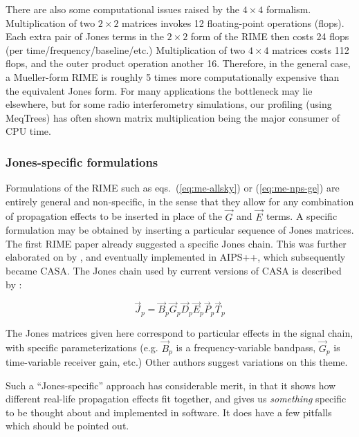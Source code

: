 \documentclass[]{aa}
\newcommand{\jones}[2]{\vec {#1}_{#2}}
\begin{document}
There are also some computational issues raised by the $4\times4$ formalism. Multiplication of two $2\times2$ matrices invokes 12 floating-point operations (flops). Each extra pair of Jones terms in the $2\times2$ form of the RIME then costs 24 flops (per time/frequency/baseline/etc.) Multiplication of two $4\times4$ matrices costs 112 flops, and the outer product operation another 16. Therefore, in the general case, a Mueller-form RIME is roughly 5 times more computationally expensive than the equivalent Jones form. For many applications the bottleneck may lie elsewhere, but for some radio interferometry simulations, our profiling (using MeqTrees) has often shown matrix multiplication being the major consumer of CPU time.

\subsubsection{Jones-specific formulations} 

Formulations of the RIME such as eqs.~(\ref{eq:me-allsky}) or (\ref{eq:me-nps-ge}) are entirely general and non-specific, in the sense that they allow for any combination of propagation effects to be inserted in place of the $\jones{G}{}$ and $\jones{E}{}$ terms. A specific formulation may be obtained by inserting a particular sequence of Jones matrices. The first RIME paper \citep{ME1} already suggested a specific Jones chain. This was further elaborated on by \citet{JEN:note185}, and eventually implemented in AIPS++, which subsequently became CASA. The Jones chain used by current versions of CASA is described by \citet[Appendix E.1]{CASA:UserRef}:

\begin{equation}\label{eq:casa}
\jones{J}{p} = \jones{B}{p} \jones{G}{p} \jones{D}{p} \jones{E}{p} \jones{P}{p} \vec  T_p
\end{equation}

The Jones matrices given here correspond to particular effects in the signal chain, with specific parameterizations (e.g. $\jones{B}{p}$ is a frequency-variable bandpass, $\jones{G}{p}$ is time-variable receiver gain, etc.) Other authors \citep{Rau:DDEs} suggest variations on this theme. 

Such a ``Jones-specific'' approach has considerable merit, in that it shows how different real-life propagation effects fit together, and gives us {\em something} specific to be thought about and implemented in software. It does have a few pitfalls which should be pointed out.
\end{document}
